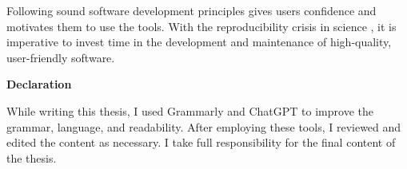     Following sound software development principles gives users confidence and motivates them to use the tools. With the reproducibility crisis in science \cite{baker20161}, it is imperative to invest time in the development and maintenance of high-quality, user-friendly software.

\newpage

\textbf{Declaration}

While writing this thesis, I used Grammarly and ChatGPT to improve the grammar, language, and readability. After employing these tools, I reviewed and edited the content as necessary. I take full responsibility for the final content of the thesis.
